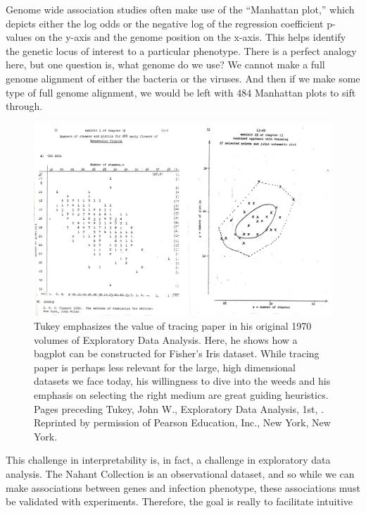 \documentclass[12pt,twoside]{mitthesis-manusdown}
\begin{document}
Genome wide association studies often make use of the ``Manhattan
plot,'' which depicts either the log odds or the negative log of the
regression coefficient p-values on the y-axis and the genome position on
the x-axis. This helps identify the genetic locus of interest to a
particular phenotype. There is a perfect analogy here, but one question
is, what genome do we use? We cannot make a full genome alignment of
either the bacteria or the viruses. And then if we make some type of
full genome alignment, we would be left with 484 Manhattan plots to sift
through.
\begin{figure}[tb!]

{\centering \includegraphics[width=1\linewidth]{figuresintro/tukeyBagplots2} 

}

\caption{\label{fig:tukeyBagplots}Tukey emphasizes the value of tracing paper in his original 1970 volumes of Exploratory Data Analysis. Here, he shows how a bagplot can be constructed for Fisher's Iris dataset. While tracing paper is perhaps less relevant for the large, high dimensional datasets we face today, his willingness to dive into the weeds and his emphasis on selecting the right medium are great guiding heuristics. Pages preceding Tukey, John W., Exploratory Data Analysis, 1st, . Reprinted by permission of Pearson Education, Inc., New York, New York.}\label{fig:tukeyBagplots}
\end{figure}
This challenge in interpretability is, in fact, a challenge in
exploratory data analysis. The Nahant Collection is an observational
dataset, and so while we can make associations between genes and
infection phenotype, these associations must be validated with
experiments. Therefore, the goal is really to facilitate intuitive
\end{document}
